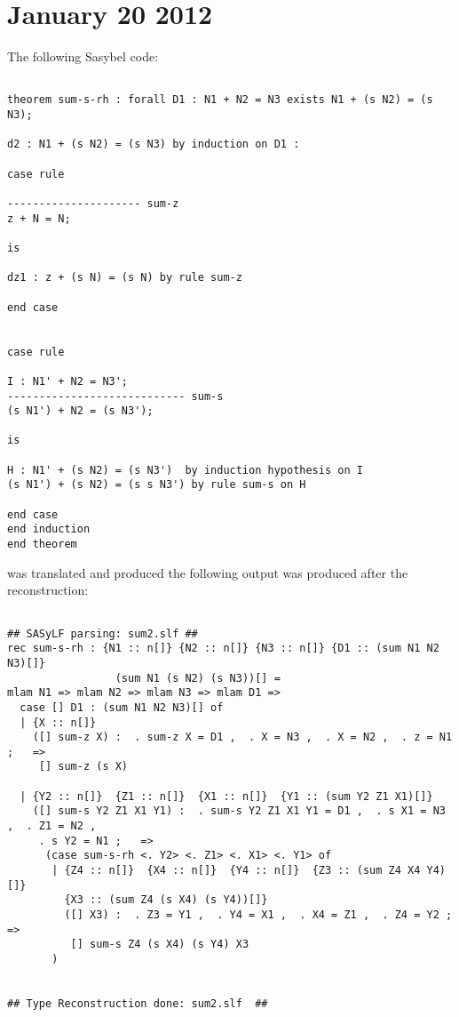 \documentclass[12pt]{article}
\begin{document}
\section{January 20 2012}
The following \textmd{Sasybel} code:
\footnotesize\begin{verbatim}

theorem sum-s-rh : forall D1 : N1 + N2 = N3 exists N1 + (s N2) = (s N3);

d2 : N1 + (s N2) = (s N3) by induction on D1 :

case rule

--------------------- sum-z
z + N = N;

is

dz1 : z + (s N) = (s N) by rule sum-z

end case


case rule

I : N1' + N2 = N3';
---------------------------- sum-s
(s N1') + N2 = (s N3');

is

H : N1' + (s N2) = (s N3')  by induction hypothesis on I
(s N1') + (s N2) = (s s N3') by rule sum-s on H

end case 
end induction
end theorem 

\end{verbatim}
was translated and produced the following output was produced after the reconstruction:
\footnotesize\begin{verbatim}

## SASyLF parsing: sum2.slf ##
rec sum-s-rh : {N1 :: n[]} {N2 :: n[]} {N3 :: n[]} {D1 :: (sum N1 N2 N3)[]}
                 (sum N1 (s N2) (s N3))[] = 
mlam N1 => mlam N2 => mlam N3 => mlam D1 => 
  case [] D1 : (sum N1 N2 N3)[] of 
  | {X :: n[]}
    ([] sum-z X) :  . sum-z X = D1 ,  . X = N3 ,  . X = N2 ,  . z = N1 ;   => 
     [] sum-z (s X)
  
  | {Y2 :: n[]}  {Z1 :: n[]}  {X1 :: n[]}  {Y1 :: (sum Y2 Z1 X1)[]}
    ([] sum-s Y2 Z1 X1 Y1) :  . sum-s Y2 Z1 X1 Y1 = D1 ,  . s X1 = N3 ,  . Z1 = N2 ,
     . s Y2 = N1 ;   => 
      (case sum-s-rh <. Y2> <. Z1> <. X1> <. Y1> of 
       | {Z4 :: n[]}  {X4 :: n[]}  {Y4 :: n[]}  {Z3 :: (sum Z4 X4 Y4)[]} 
         {X3 :: (sum Z4 (s X4) (s Y4))[]}
         ([] X3) :  . Z3 = Y1 ,  . Y4 = X1 ,  . X4 = Z1 ,  . Z4 = Y2 ;   => 
          [] sum-s Z4 (s X4) (s Y4) X3
       )
  

## Type Reconstruction done: sum2.slf  ##



\end{verbatim}
\end{document}
